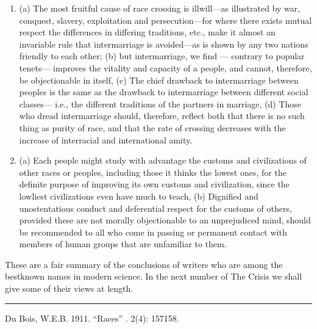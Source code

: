 \documentclass[letterpaper,10pt,english]{jupyterBook}
\begin{document}
\begin{enumerate}
\item {} 
\sphinxAtStartPar
(a) The most fruitful cause of race crossing is ill\sphinxhyphen{}will—as illustrated by war, conquest, slavery, exploitation and persecution—for where there exists mutual respect the differences in differing traditions, etc., make it almost an invariable rule that intermarriage is avoided—as is shown by any two nations friendly to each other; (b) but intermarriage, we find — contrary to popular tenets— improves the vitality and capacity of a people, and cannot, therefore, be objectionable in itself, (c) The chief drawback to intermarriage between peoples is the same as the drawback to intermarriage between different social classes— i.e., the different traditions of the partners in marriage, (d) Those who dread intermarriage should, therefore, reflect both that there is no such thing as purity of race, and that the rate of crossing decreases with the increase of interracial and international amity.

\item {} 
\sphinxAtStartPar
(a) Each people  might study with advantage the customs and civilizations of other races or peoples, including those it thinks the lowest ones, for the definite purpose of improving its own customs and civilization, since the lowliest civilizations even have much to teach, (b) Dignified and unostentatious conduct and deferential respect for the customs of others, provided these are not morally objectionable to an unprejudiced mind, should be recommended to all who come in passing or permanent contact with members of human groups that are unfamiliar to them.

\end{enumerate}

\sphinxAtStartPar
These are a fair summary of the conclusions of writers who are among the best\sphinxhyphen{}known names in modern science. In the next number of The Crisis we shall give some of their views at length.


\bigskip\hrule\bigskip


\sphinxAtStartPar
{} Du Bois, W.E.B. 1911. “Races”  . 2(4): 157\sphinxhyphen{}158.
\end{document}
